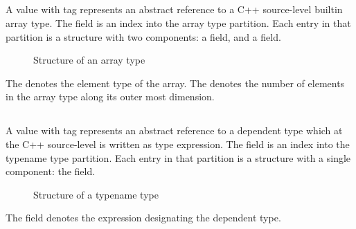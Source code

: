 
\subsection{}
\label{sec:ifc:TypeSort:Array}

A  value with tag  represents
an abstract reference to a C++ source-level builtin array type.
The  field is an index into the array type partition.
Each entry in that partition is a structure with two components: a  field,
and a  field.
%
\begin{figure}[H]
	\centering
	\caption{Structure of an array type}
	\label{fig:ifc-array-type-structure}
\end{figure}
%
The  denotes the element type of the array.
The  denotes the number of elements in the array type along its outer most dimension.



\subsection{}
\label{sec:ifc:TypeSort:Typename}

A  value with tag  represents
an abstract reference to a dependent type which at the C++ source-level is
written as type expression.
The  field is an index into the typename type partition.
Each entry in that partition is a structure with a single component: the  field.
%
\begin{figure}[H]
	\centering
	\caption{Structure of a typename type}
	\label{fig:ifc-typename-type-structure}
\end{figure}
%
The  field denotes the expression designating the dependent type.


\subsection{}
\label{sec:ifc:TypeSort:Qualified}

